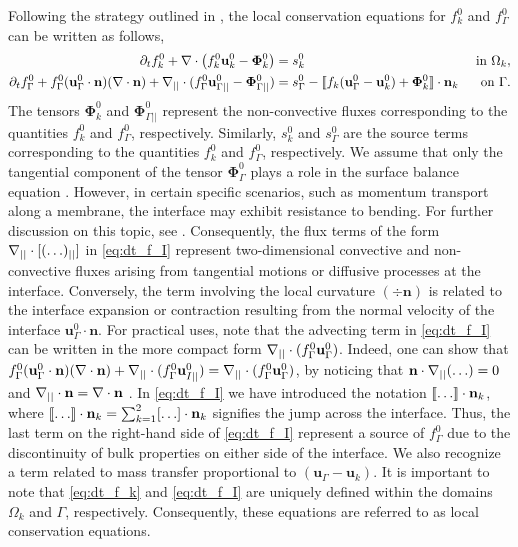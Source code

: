 \documentclass[11pt]{My_preprint}
\begin{document}
Following the strategy outlined in \citep{ishii2010thermo,bothe2022sharp}, the local conservation equations for $f_k^0$ and $f_\Gamma^0$ can be written as follows,
\begin{align}
    \label{eq:dt_f_k}
    \pddt f_k^0
    +\div \left(
        f_k^0\textbf{u}_k^0
        - \mathbf{\Phi}_k^0
        \right)
    &= 
    s_k^0
    & \text{ in } \Omega_k,&\\
    \pddt f_\Gamma^0 
    + f_\Gamma^0 (\textbf{u}_\Gamma^0 \cdot \textbf{n})(\div \textbf{n})
    +\divI
    (f_\Gamma^0 \textbf{u}_{\Gamma||}^0
        - \mathbf{\Phi}_{\Gamma||}^0 )
    &= 
    s_\Gamma^0
    - \Jump{
       f_k (\textbf{u}_\Gamma^0 - \textbf{u}_k^0)
       + \mathbf{\Phi}_k^0
    } 
    & \text{ on } \Gamma.&
    \label{eq:dt_f_I}
\end{align}
The tensors $\mathbf{\Phi}_k^0$ and $\mathbf{\Phi}_{\Gamma||}^0$ represent the non-convective fluxes corresponding to the quantities $f_k^0$ and $f_\Gamma^0$, respectively. Similarly, $s_k^0$ and $s_\Gamma^0$ are the source terms corresponding to the quantities $f_k^0$ and $f_\Gamma^0$, respectively. We assume that only the tangential component of the tensor $\mathbf{\Phi}_{\Gamma}^0$ plays a role in the surface balance equation \citep{bothe2022sharp}. However, in certain specific scenarios, such as momentum transport along a membrane, the interface may exhibit resistance to bending. For further discussion on this topic, see \citet{jaensson2021}. Consequently, the flux terms of the form $\mathbf{\nabla}_{||}\cdot[(\ldots)_{||}]$ in \ref{eq:dt_f_I} represent two-dimensional  convective and non-convective fluxes arising from tangential motions or diffusive processes at the interface.
Conversely, the term involving the local curvature $(\div \textbf{n})$ is related to the interface expansion or contraction resulting from the normal velocity of the interface $\textbf{u}_\Gamma^0\cdot \textbf{n}$. For practical uses, note that the advecting term in \ref{eq:dt_f_I} can be written in the more compact form $\mathbf{\nabla}_{||}\cdot(f_\Gamma^0 \textbf{u}_\Gamma^0)$. 
Indeed, one can show that $f_\Gamma^0 (\textbf{u}_\Gamma^0 \cdot \textbf{n})(\mathbf{\nabla}\cdot \textbf{n})
+\mathbf{\nabla}_{||}\cdot(f_\Gamma^0 \textbf{u}_{I||}^0) = \mathbf{\nabla}_{||}\cdot(f_\Gamma^0 \textbf{u}_\Gamma^0)$, by noticing that $\textbf{n}\cdot\mathbf{\nabla}_{||}(\ldots) = 0$ and $\mathbf{\nabla}_{||}\cdot\textbf{n} = \mathbf{\nabla}\cdot\textbf{n}$ \citep{nadim1996concise}.
In \ref{eq:dt_f_I} we have introduced the notation $\llbracket \ldots \rrbracket \cdot \textbf{n}_k$, where $\llbracket \ldots \rrbracket \cdot \textbf{n}_k = \sum_{k=1}^2 [\ldots] \cdot \textbf{n}_k$ signifies the jump across the interface. Thus, the last term on the right-hand side of \ref{eq:dt_f_I} represent a source of $f_\Gamma^0$ due to the discontinuity of bulk properties on either side of the interface. We also recognize a term related to mass transfer proportional to $(\textbf{u}_\Gamma - \textbf{u}_k)$. It is important to note that \ref{eq:dt_f_k} and \ref{eq:dt_f_I} are uniquely defined within the domains $\Omega_k$ and $\Gamma$, respectively.
Consequently, these equations are referred to as local conservation equations.
\end{document}
